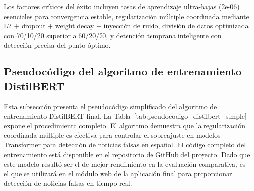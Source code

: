 Los factores críticos del éxito incluyen tasas de aprendizaje ultra-bajas (2e-06) esenciales para convergencia estable, regularización múltiple coordinada mediante L2 + dropout + weight decay + inyección de ruido, división de datos optimizada con 70/10/20 superior a 60/20/20, y detención temprana inteligente con detección precisa del punto óptimo.

\subsection{Pseudocódigo del algoritmo de entrenamiento DistilBERT}
\label{subsec:pseudocodigo_distilbert}

Esta subsección presenta el pseudocódigo simplificado del algoritmo de entrenamiento DistilBERT final. La Tabla~\ref{tab:pseudocodigo_distilbert_simple} expone el procedimiento completo. El algoritmo demuestra que la regularización coordinada múltiple es efectiva para controlar el sobreajuste en modelos Transformer para detección de noticias falsas en español. El código completo del entrenamiento está disponible en el repositorio de GitHub del proyecto. Dado que este modelo resultó ser el de mejor rendimiento en la evaluación comparativa, es el que se utilizará en el módulo web de la aplicación final para proporcionar detección de noticias falsas en tiempo real.

